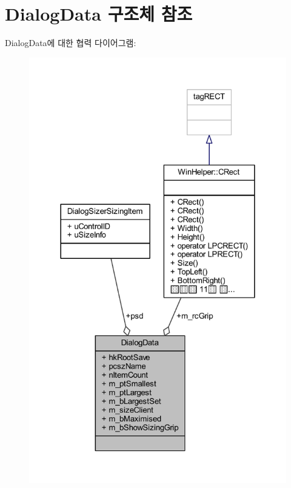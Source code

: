 \hypertarget{struct_dialog_data}{}\section{Dialog\+Data 구조체 참조}
\label{struct_dialog_data}


Dialog\+Data에 대한 협력 다이어그램\+:\nopagebreak
\begin{figure}[H]
\begin{center}
\leavevmode
\includegraphics[width=324pt]{struct_dialog_data__coll__graph}
\end{center}
\end{figure}
